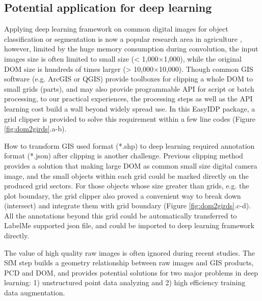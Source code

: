 \documentclass[doublespacing]{configs/bmcart}
\begin{document}
\subsection*{Potential application for deep learning}
Applying deep learning framework on common digital images for object classification or segmentation is now a popular research area in agriculture \cite{zhou_fast_2020, feng_evaluation_2020, desai_automatic_2019}, however, limited by the huge memory consumption during convolution, the input images size is often limited to small size (< 1,000$\times$1,000), while the original DOM size is hundreds of times larger (> 10,000$\times$10,000). Though common GIS software (e.g. ArcGIS or QGIS) provide toolboxes for clipping a whole DOM to small grids (parts), and may also provide programmable API for script or batch processing, to our practical experiences, the processing steps as well as the API learning cost build a wall beyond widely spread use. In this EasyIDP package, a grid clipper is provided to solve this requirement within a few line codes (Figure \ref{fig:dom2girds}.a-b).

How to transform GIS used format (*.shp) to deep learning required annotation format (*.json) after clipping is another challenge. Previous clipping method provides a solution that making large DOM as common small size digital camera image, and the small objects within each grid could be marked directly on the produced grid sectors. For those objects whose size greater than grids, e.g. the plot boundary, the grid clipper also proved a convenient way to break down (intersect) and integrate them with grid boundary (Figure \ref{fig:dom2girds}.c-d). All the annotations beyond this grid could be automatically transferred to LabelMe supported json file, and could be imported to deep learning framework directly.

The value of high quality raw images is often ignored during recent studies. The SfM step builds a geometry relationship between raw images and GIS products, PCD and DOM, and provides potential solutions for two major problems in deep learning: 1) unstructured point data analyzing and 2) high efficiency training data augmentation.
\end{document}
